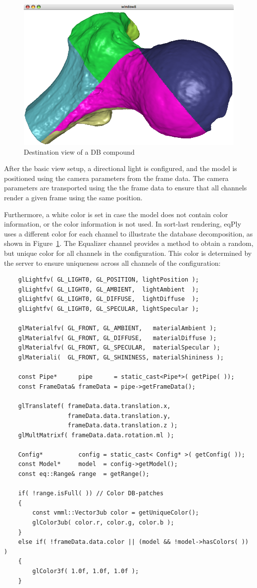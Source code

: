 \documentclass[10pt,a4]{scrartcl}
\newcommand{\fig}[1]{Figure~\ref{#1}}
\begin{document}
\begin{figure}
  \includegraphics[width=.382\textwidth]{images/DB.png}
  {\caption{\small\label{fDBDest}Destination view of a DB compound}}
\end{figure}
After the basic view setup, a directional light is configured, and the
model is positioned using the camera parameters from the frame data. The
camera parameters are transported using the the frame data to ensure
that all channels render a given frame using the same position.

Furthermore, a white color is set in case the model does not contain
color information, or the color information is not used. In sort-last
rendering, \textsf{eqPly} uses a different color for each channel to
illustrate the database decomposition, as shown in \fig{fDBDest}. The
Equalizer channel provides a method to obtain a random, but unique color
for all channels in the configuration. This color is determined by the
server to ensure uniqueness across all channels of the configuration:

{\footnotesize\begin{lstlisting}
    glLightfv( GL_LIGHT0, GL_POSITION, lightPosition );
    glLightfv( GL_LIGHT0, GL_AMBIENT,  lightAmbient  );
    glLightfv( GL_LIGHT0, GL_DIFFUSE,  lightDiffuse  );
    glLightfv( GL_LIGHT0, GL_SPECULAR, lightSpecular );

    glMaterialfv( GL_FRONT, GL_AMBIENT,   materialAmbient );
    glMaterialfv( GL_FRONT, GL_DIFFUSE,   materialDiffuse );
    glMaterialfv( GL_FRONT, GL_SPECULAR,  materialSpecular );
    glMateriali(  GL_FRONT, GL_SHININESS, materialShininess );

    const Pipe*      pipe      = static_cast<Pipe*>( getPipe( ));
    const FrameData& frameData = pipe->getFrameData();

    glTranslatef( frameData.data.translation.x,
                  frameData.data.translation.y,
                  frameData.data.translation.z );
    glMultMatrixf( frameData.data.rotation.ml );

    Config*          config = static_cast< Config* >( getConfig( ));
    const Model*     model  = config->getModel();
    const eq::Range& range  = getRange();

    if( !range.isFull( )) // Color DB-patches
    {
        const vmml::Vector3ub color = getUniqueColor();
        glColor3ub( color.r, color.g, color.b );
    }
    else if( !frameData.data.color || (model && !model->hasColors( )) )
    {
        glColor3f( 1.0f, 1.0f, 1.0f );
    }
    
\end{lstlisting}}
\end{document}
